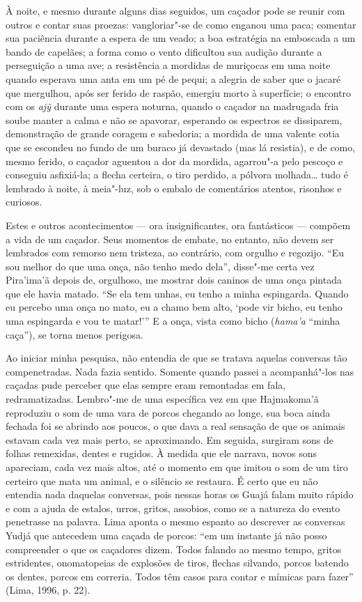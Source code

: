 À noite, e mesmo durante alguns dias seguidos, um caçador pode se reunir
com outros e contar suas proezas: vangloriar"-se de como enganou uma
paca; comentar sua paciência durante a espera de um veado; a boa
estratégia na emboscada a um bando de capelães; a forma como o vento
dificultou sua audição durante a perseguição a uma ave; a resistência a
mordidas de muriçocas em uma noite quando esperava uma anta em um pé de
pequi; a alegria de saber que o jacaré que mergulhou, após ser ferido de
raspão, emergiu morto à superfície; o encontro com os \emph{ajỹ} durante
uma espera noturna, quando o caçador na madrugada fria soube manter a
calma e não se apavorar, esperando os espectros se dissiparem,
demonstração de grande coragem e sabedoria; a mordida de uma valente
cotia que se escondeu no fundo de um buraco já devastado (mas lá
resistia), e de como, mesmo ferido, o caçador aguentou a dor da mordida,
agarrou"-a pelo pescoço e conseguiu asfixiá-la; a flecha certeira, o tiro
perdido, a pólvora molhada\ldots{} tudo é lembrado à noite, à meia"-luz, sob o
embalo de comentários atentos, risonhos e curiosos.

Estes e outros acontecimentos --- ora insignificantes, ora fantásticos ---
compõem a vida de um caçador. Seus momentos de embate, no entanto, não
devem ser lembrados com remorso nem tristeza, ao contrário, com orgulho
e regozijo. ``Eu sou melhor do que uma onça, não tenho medo dela'',
disse"-me certa vez Pira'ima'ã depois de, orgulhoso, me mostrar dois
caninos de uma onça pintada que ele havia matado. ``Se ela tem unhas, eu
tenho a minha espingarda. Quando eu percebo uma onça no mato, eu a chamo
bem alto, `pode vir bicho, eu tenho uma espingarda e vou te matar!''' E
a onça, vista como bicho (\emph{hama'a} ``minha caça''), se torna menos
perigosa.

Ao iniciar minha pesquisa, não entendia de que se tratava aquelas
conversas tão compenetradas. Nada fazia sentido. Somente quando passei a
acompanhá"-los nas caçadas pude perceber que elas sempre eram remontadas
em fala, redramatizadas. Lembro"-me de uma específica vez em que
Hajmakoma'ã reproduziu o som de uma vara de porcos chegando ao longe,
sua boca ainda fechada foi se abrindo aos poucos, o que dava a real
sensação de que os animais estavam cada vez mais perto, se aproximando.
Em seguida, surgiram sons de folhas remexidas, dentes e rugidos. À
medida que ele narrava, novos sons apareciam, cada vez mais altos, até o
momento em que imitou o som de um tiro certeiro que mata um animal, e o
silêncio se restaura. É certo que eu não entendia nada daquelas
conversas, pois nessas horas os Guajá falam muito rápido e com a ajuda
de estalos, urros, gritos, assobios, como se a natureza do evento
penetrasse na palavra. Lima aponta o mesmo espanto ao descrever as
conversas Yudjá que antecedem uma caçada de porcos: ``em um instante já
não posso compreender o que os caçadores dizem. Todos falando ao mesmo
tempo, gritos estridentes, onomatopeias de explosões de tiros, flechas
silvando, porcos batendo os dentes, porcos em correria. Todos têm casos
para contar e mímicas para fazer'' (Lima, 1996, p. 22).

